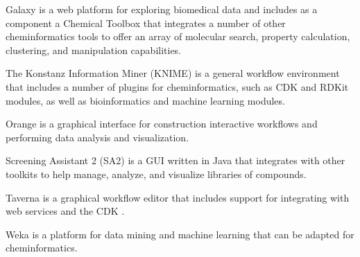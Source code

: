 Galaxy \cite{Goecks_2010} is a web platform for exploring biomedical data and includes as a component a Chemical Toolbox that integrates a number of other cheminformatics tools to offer an array of molecular search, property calculation, clustering, and manipulation capabilities.

The Konstanz Information Miner (KNIME) is a general workflow environment that includes a number of plugins for cheminformatics, such as CDK \cite{Beisken_2013} and RDKit modules, as well as bioinformatics and machine learning modules.

Orange  \cite{JMLR:demsar13a} is a graphical interface for construction interactive workflows and performing data analysis and visualization.

Screening Assistant 2 (SA2) \cite{Guilloux_2012} is a GUI written in Java that integrates with other toolkits to help manage, analyze, and visualize libraries of compounds.

Taverna \cite{Wolstencroft_2013} is a graphical workflow editor that includes support for integrating with web services and the CDK \cite{Kuhn_2010}.

Weka \cite{Hall_2009} is a platform for data mining and machine learning that can be adapted for cheminformatics.  
